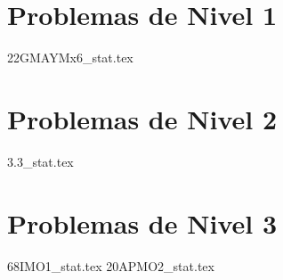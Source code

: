 \section{Problemas de Nivel 1}
{22GMAYMx6_stat.tex} %

\section{Problemas de Nivel 2}
{3.3_stat.tex} %

\section{Problemas de Nivel 3}
{68IMO1_stat.tex} %
{20APMO2_stat.tex} %
